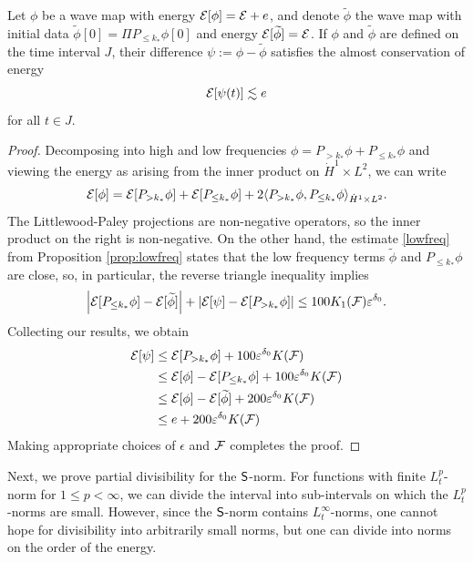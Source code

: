 \begin{lemma}
	Let $\phi$ be a wave map with energy $\mathcal E[\phi] = \mathcal E + e$, and denote $\widetilde \phi$ the wave map with initial data $\widetilde \phi[0] = \Pi P_{\leq k_*} \phi[0]$ and energy $\mathcal E[\widetilde \phi] = \mathcal E$. If $\phi$ and $\widetilde \phi$ are defined on the time interval $J$, their difference $\psi := \phi - \widetilde \phi$ satisfies the almost conservation of energy
		\begin{equation}
			\mathcal E[\psi(t)] \lesssim e\label{eq:psiconserve}
		\end{equation}
	for all $t \in J$. 
\end{lemma}

\begin{proof}
	Decomposing into high and low frequencies $\phi = P_{> k_*} \phi + P_{\leq k_*} \phi$ and viewing the energy as arising from the inner product on $\dot H^1 \times L^2$, we can write
		\[
			\mathcal E[\phi] = \mathcal E[P_{> k_*} \phi] + \mathcal E[P_{\leq k_*} \phi] + 2 \langle P_{> k_*} \phi, P_{\leq k_*} \phi \rangle_{\dot H^1 \times L^2}.
		\]
	The Littlewood-Paley projections are non-negative operators, so the inner product on the right is non-negative. On the other hand, the estimate \eqref{lowfreq} from Proposition \ref{prop:lowfreq} states that the low frequency terms $\widetilde \phi$ and $P_{\leq k_*} \phi$ are close, so, in particular, the reverse triangle inequality implies
		\[
			\left|\mathcal E[P_{\leq k_*} \phi] - \mathcal E[\widetilde \phi]\right| + \left|\mathcal E[\psi] - \mathcal E[P_{> k_*} \phi]\right| \leq 100K_1 (\mathcal F) \varepsilon^{\delta_0}. 
		\]
	Collecting our results, we obtain
		\begin{align*}
			\mathcal E[\psi]
				&\leq \mathcal E[P_{> k_*} \phi] + 100 \varepsilon^{\delta_0} K(\mathcal F) \\
				&\leq \mathcal E[\phi] - \mathcal E[P_{\leq k_*} \phi] + 100\varepsilon^{\delta_0} K(\mathcal F)\\
				&\leq \mathcal E[\phi] - \mathcal E[\widetilde \phi] + 200 \varepsilon^{\delta_0} K (\mathcal F) \\
				&\leq e +  200 \varepsilon^{\delta_0} K (\mathcal F)
		\end{align*}	
	Making appropriate choices of $\epsilon$ and $\mathcal F$ completes the proof. 	
\end{proof}

Next, we prove partial divisibility for the $\mathsf S$-norm. For functions with finite $L^p_t$-norm for $1 \leq p < \infty$, we can divide the interval into sub-intervals on which the $L^p_t$-norms are small. However, since the $\mathsf S$-norm contains $L^\infty_t$-norms, one cannot hope for divisibility into arbitrarily small norms, but one can divide into norms on the order of the energy. 


